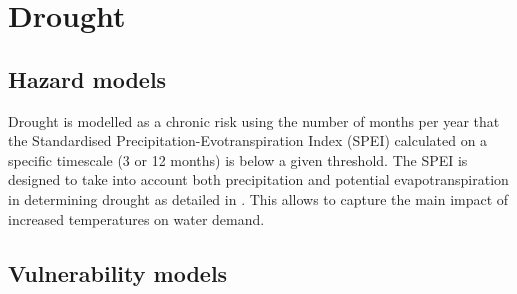 \documentclass[a4paper,11pt]{extarticle} %
\theoremstyle{definition}
\begin{document}
\section{Drought}
\subsection{Hazard models}
Drought is modelled as a chronic risk using the number of months per year that the Standardised Precipitation-Evotranspiration Index (SPEI) calculated on a specific timescale (3 or 12 months) is below a given threshold. The SPEI is designed to take into account both precipitation and potential evapotranspiration in determining drought as detailed in \cite{VicenteSerranoEtAl:2010}. This allows to capture the main impact of increased temperatures on water demand.

\subsection{Vulnerability models}
\end{document}
